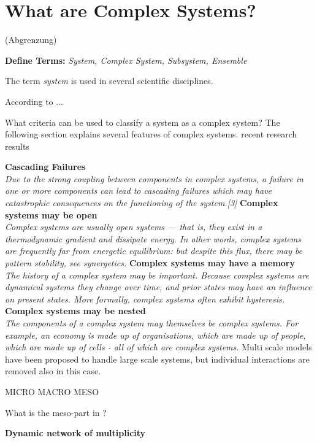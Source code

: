 \documentclass[a4paper,10pt]{scrbook}
\begin{document}
\section{What are Complex Systems?} (Abgrenzung) 

%
%
\textbf{Define Terms:} \textit{System, Complex System, Subsystem, Ensemble}

The term \textit{system} is used in several scientific disciplines. 

According to ... \citep{Roche199} %


What criteria can be used to classify a system as a complex system? The following section explains several features of complex systems. recent research results


\textbf{Cascading Failures}\\

\textit{Due to the strong coupling between components in complex systems, a failure in one or more components can lead to cascading failures which may have catastrophic consequences on the functioning of the system.[3]
}
\textbf{Complex systems may be open}\\

\textit{Complex systems are usually open systems — that is, they exist in a thermodynamic gradient and dissipate energy. In other words, complex systems are frequently far from energetic equilibrium: but despite this flux, there may be pattern stability, see synergetics.
}
\textbf{Complex systems may have a memory}\\

\textit{The history of a complex system may be important. Because complex systems are dynamical systems they change over time, and prior states may have an influence on present states. More formally, complex systems often exhibit hysteresis.
}
\textbf{Complex systems may be nested}\\

\textit{The components of a complex system may themselves be complex systems. For example, an economy is made up of organisations, which are made up of people, which are made up of cells - all of which are complex systems.
}
Multi scale models have been proposed to handle large scale systems, but
individual interactions are removed also in this case. 

MICRO MACRO MESO 

What is the meso-part in \cite{Jesus2009}?


\textbf{Dynamic network of multiplicity}\\
\end{document}
